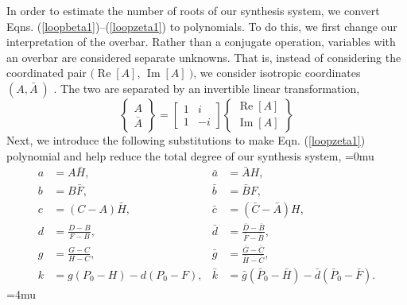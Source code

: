 \documentclass[journal]{IEEEtran}
\def\*#1{\bar{#1}} %
\begin{document}
In order to estimate the number of roots of our synthesis system, we convert Eqns. (\ref{loopbeta1})--(\ref{loopzeta1}) to polynomials.
To do this, we first change our interpretation of the overbar.  Rather than a conjugate operation, variables with an overbar are considered separate unknowns.  
That is, instead of considering the coordinated pair $\big(\operatorname{Re}[A], \, \operatorname{Im}[A]\:\big)$, we consider isotropic coordinates $(A, \*A\:)$ \cite{wamplerIsotropicCoordinatesCircularity1996}.  The two are separated by an invertible linear transformation,
\begin{equation}
\begin{Bmatrix} A \\ \*A \end{Bmatrix} =
\begin{bmatrix} 1 & i \\ 1 & -i \end{bmatrix}
\begin{Bmatrix} \operatorname{Re}[A] \\ \operatorname{Im}[A] \end{Bmatrix}
\end{equation}
Next, we introduce the following substitutions to make Eqn. (\ref{loopzeta1}) polynomial and help reduce the total degree of our synthesis system,
\medmuskip=0mu
\begin{align}
a &= A\*H, & \*a &= \*AH, \label{sub1}\\
b &= B\*F, & \*b &= \*BF, \label{sub2}\\
c &= (C-A)\*H, & \*c &= (\*C-\*A)H, \label{sub3}\\
d &= \frac{D-B}{F-B}, & \*d &= \frac{\*D-\*B}{\*F-\*B}, \label{sub4}\\
g &= \frac{G-C}{H-C}, & \*g &= \frac{\*G-\*C}{\*H-\*C}, \label{sub5}\\
k &= g(P_0-H) - d(P_0-F), & \*k &= \*g(\*P_0-\*H) - \*d(\*P_0-\*F). \label{sub6}
\end{align}
\medmuskip=4mu
\end{document}
